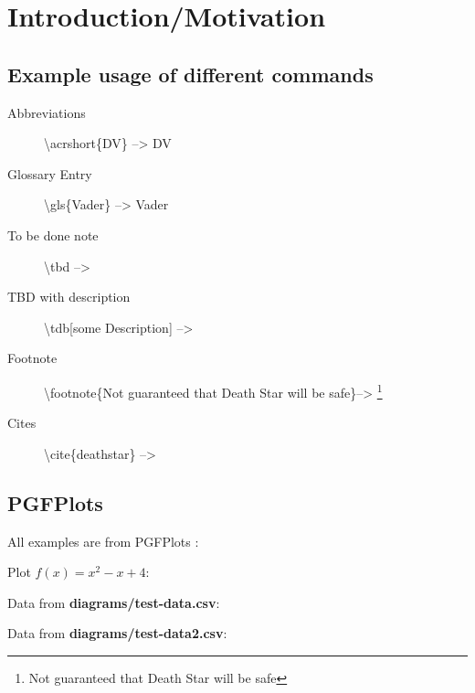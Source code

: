 \chapter{Introduction/Motivation}
\section{Example usage of different commands}


 \begin{description}
	\item[Abbreviations] \textbackslash acrshort\{DV\} -->  \acrshort{DV}
	\item[Glossary Entry] \textbackslash gls\{Vader\} -->  \gls{Vader}
	\item[To be done note] \textbackslash tbd --> \tbd
	\item[TBD with description] \textbackslash tdb[some Description] --> 
	\item[Footnote] \textbackslash footnote\{Not guaranteed that Death Star will be safe\}--> \footnote{Not guaranteed that Death Star will be safe}
	\item[Cites] \textbackslash cite\{deathstar\} --> \cite{deathstar}
 \end{description}
 
 
\section{PGFPlots}

All examples are from PGFPlots \cite{pgfplots:sourceforge}:

Plot \textbf{$f(x) = x^2 - x +4$}:



Data from \textbf{diagrams/test-data.csv}:

\loadedtable
{}

Data from \textbf{diagrams/test-data2.csv}:

\loadTestData
{}


